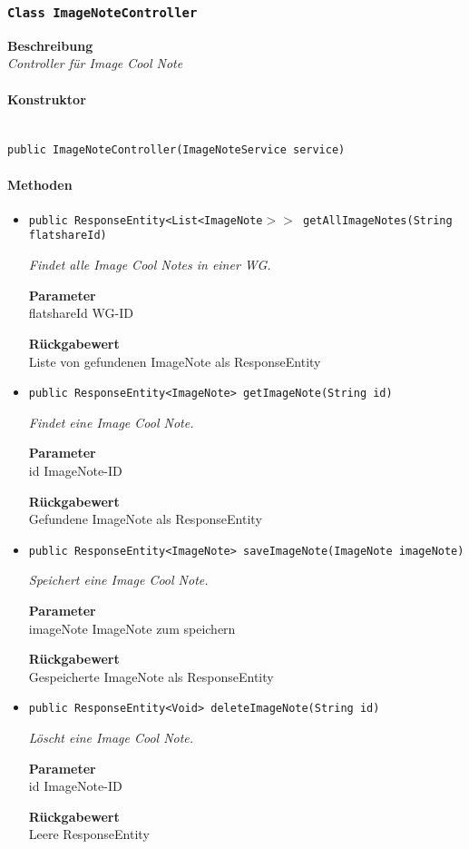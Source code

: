     \subsubsection{\texttt{Class ImageNoteController}}
    \textbf{Beschreibung} \\
    \textit{Controller für Image Cool Note}
    \paragraph*{Konstruktor}\mbox{} \\
    \texttt{public ImageNoteController(ImageNoteService service)} \\
    \paragraph*{Methoden}
    \begin{itemize}
    	\item{\texttt{public ResponseEntity<List<ImageNote$>>$ getAllImageNotes(String flatshareId)}}
    	
    	\textit{Findet alle Image Cool Notes in einer WG.}
    	
    	\textbf{Parameter} \\
    	flatshareId WG-ID
    	
    	\textbf{Rückgabewert} \\
    	Liste von gefundenen ImageNote als ResponseEntity        \item{\texttt{public ResponseEntity<ImageNote> getImageNote(String id)}}
    	
    	\textit{Findet eine Image Cool Note.}
    	
    	\textbf{Parameter} \\
    	id ImageNote-ID
    	
    	\textbf{Rückgabewert} \\
    	Gefundene ImageNote als ResponseEntity        \item{\texttt{public ResponseEntity<ImageNote> saveImageNote(ImageNote imageNote)}}
    	
    	\textit{Speichert eine Image Cool Note.}
    	
    	\textbf{Parameter} \\
    	imageNote ImageNote zum speichern
    	
    	\textbf{Rückgabewert} \\
    	Gespeicherte ImageNote als ResponseEntity        \item{\texttt{public ResponseEntity<Void> deleteImageNote(String id)}}
    	
    	\textit{Löscht eine Image Cool Note.}
    	
    	\textbf{Parameter} \\
    	id ImageNote-ID
    	
    	\textbf{Rückgabewert} \\
    	Leere ResponseEntity
    \end{itemize}
